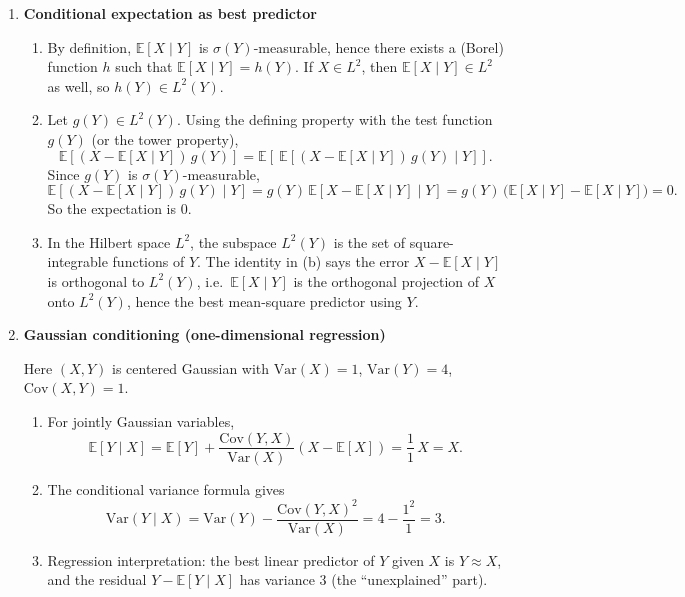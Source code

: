 \documentclass[11pt]{article}
\begin{document}
\begin{enumerate}
\bigskip

\item \textbf{Conditional expectation as best predictor}

\begin{enumerate}
\item By definition, $\mathbb{E}[X\mid Y]$ is $\sigma(Y)$-measurable, hence there exists a (Borel) function $h$
such that $\mathbb{E}[X\mid Y]=h(Y)$. If $X\in L^2$, then $\mathbb{E}[X\mid Y]\in L^2$ as well, so $h(Y)\in L^2(Y)$.

\item Let $g(Y)\in L^2(Y)$. Using the defining property with the test function $g(Y)$ (or the tower property),
\[
\mathbb{E}\!\left[(X-\mathbb{E}[X\mid Y])\,g(Y)\right]
=\mathbb{E}\!\left[\ \mathbb{E}\!\left[(X-\mathbb{E}[X\mid Y])\,g(Y)\mid Y\right]\right].
\]
Since $g(Y)$ is $\sigma(Y)$-measurable,
\[
\mathbb{E}\!\left[(X-\mathbb{E}[X\mid Y])\,g(Y)\mid Y\right]
=g(Y)\,\mathbb{E}\!\left[X-\mathbb{E}[X\mid Y]\mid Y\right]
=g(Y)\,\big(\mathbb{E}[X\mid Y]-\mathbb{E}[X\mid Y]\big)=0.
\]
So the expectation is $0$.

\item In the Hilbert space $L^2$, the subspace $L^2(Y)$ is the set of square-integrable functions of $Y$.
The identity in (b) says the error $X-\mathbb{E}[X\mid Y]$ is orthogonal to $L^2(Y)$, i.e.\ $\mathbb{E}[X\mid Y]$
is the orthogonal projection of $X$ onto $L^2(Y)$, hence the best mean-square predictor using $Y$.
\end{enumerate}

\bigskip

\item \textbf{Gaussian conditioning (one-dimensional regression)}

Here $(X,Y)$ is centered Gaussian with $\mathrm{Var}(X)=1$, $\mathrm{Var}(Y)=4$, $\mathrm{Cov}(X,Y)=1$.

\begin{enumerate}
\item For jointly Gaussian variables,
\[
\mathbb{E}[Y\mid X]=\mathbb{E}[Y]+\frac{\mathrm{Cov}(Y,X)}{\mathrm{Var}(X)}(X-\mathbb{E}[X])
=\frac{1}{1}\,X=X.
\]

\item The conditional variance formula gives
\[
\mathrm{Var}(Y\mid X)=\mathrm{Var}(Y)-\frac{\mathrm{Cov}(Y,X)^2}{\mathrm{Var}(X)}
=4-\frac{1^2}{1}=3.
\]

\item Regression interpretation: the best linear predictor of $Y$ given $X$ is $Y\approx X$, and the residual
$Y-\mathbb{E}[Y\mid X]$ has variance $3$ (the ``unexplained'' part).
\end{enumerate}


\end{enumerate}
\end{document}

